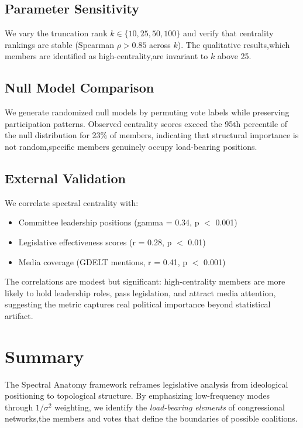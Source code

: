 \documentclass[11pt,a4paper]{article}
\begin{document}
\subsection{Parameter Sensitivity}

We vary the truncation rank $k \in \{10, 25, 50, 100\}$ and verify that centrality rankings are stable (Spearman $\rho > 0.85$ across $k$). The qualitative results,which members are identified as high-centrality,are invariant to $k$ above 25.

\subsection{Null Model Comparison}

We generate randomized null models by permuting vote labels while preserving participation patterns. Observed centrality scores exceed the 95th percentile of the null distribution for 23\% of members, indicating that structural importance is not random,specific members genuinely occupy load-bearing positions.

\subsection{External Validation}

We correlate spectral centrality with:
\begin{itemize}
    \item Committee leadership positions (gamma = 0.34, p $<$ 0.001)
    \item Legislative effectiveness scores \citep{volden2014} (r = 0.28, p $<$ 0.01)
    \item Media coverage (GDELT mentions, r = 0.41, p $<$ 0.001)
\end{itemize}

The correlations are modest but significant: high-centrality members are more likely to hold leadership roles, pass legislation, and attract media attention, suggesting the metric captures real political importance beyond statistical artifact.

\section{Summary}

The Spectral Anatomy framework reframes legislative analysis from ideological positioning to topological structure. By emphasizing low-frequency modes through $1/\sigma^2$ weighting, we identify the \textit{load-bearing elements} of congressional networks,the members and votes that define the boundaries of possible coalitions.
\end{document}

